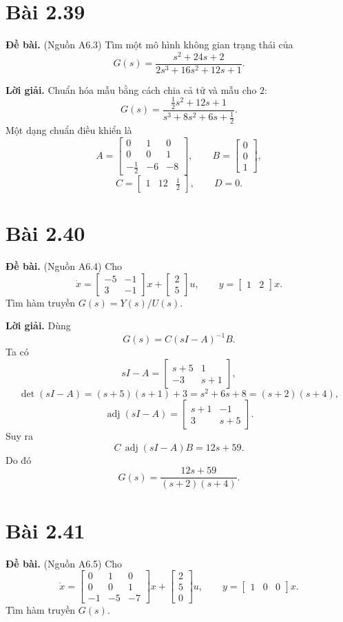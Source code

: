 \documentclass[11pt,a4paper]{article}
\newcommand{\baitap}[1]{%
  \Needspace{4\baselineskip}%
  \section*{Bài #1}%
}
\newcommand{\debai}{\par\noindent\textbf{Đề bài.}\enspace}
\newcommand{\loigiai}{\par\smallskip\noindent\textbf{Lời giải.}\enspace}
\begin{document}
\baitap{2.39}
\debai
(Nguồn A6.3) Tìm một mô hình không gian trạng thái của
\[
G(s)=
\frac{s^2+24s+2}
{2s^3+16s^2+12s+1}.
\]

\loigiai
Chuẩn hóa mẫu bằng cách chia cả tử và mẫu cho \(2\):
\[
G(s)
=
\frac{\frac12s^2+12s+1}
{s^3+8s^2+6s+\frac12}.
\]
Một dạng chuẩn điều khiển là
\[
\boxed{
A=
\begin{bmatrix}
0&1&0\\
0&0&1\\
-\frac12&-6&-8
\end{bmatrix},
\qquad
B=
\begin{bmatrix}
0\\0\\1
\end{bmatrix},
}
\]
\[
\boxed{
C=
\begin{bmatrix}
1&12&\frac12
\end{bmatrix},
\qquad D=0.
}
\]

\baitap{2.40}
\debai
(Nguồn A6.4) Cho
\[
\dot x=
\begin{bmatrix}
-5&-1\\
3&-1
\end{bmatrix}x
+
\begin{bmatrix}
2\\5
\end{bmatrix}u,
\qquad
y=
\begin{bmatrix}
1&2
\end{bmatrix}x.
\]
Tìm hàm truyền \(G(s)=Y(s)/U(s)\).

\loigiai
Dùng
\[
G(s)=C(sI-A)^{-1}B.
\]
Ta có
\[
sI-A=
\begin{bmatrix}
s+5&1\\
-3&s+1
\end{bmatrix},
\]
\[
\det(sI-A)
=
(s+5)(s+1)+3
=
s^2+6s+8
=
(s+2)(s+4),
\]
\[
\operatorname{adj}(sI-A)
=
\begin{bmatrix}
s+1&-1\\
3&s+5
\end{bmatrix}.
\]
Suy ra
\[
C\,\operatorname{adj}(sI-A)B
=
12s+59.
\]
Do đó
\[
\boxed{
G(s)=
\frac{12s+59}{(s+2)(s+4)}.
}
\]

\baitap{2.41}
\debai
(Nguồn A6.5) Cho
\[
\dot x=
\begin{bmatrix}
0&1&0\\
0&0&1\\
-1&-5&-7
\end{bmatrix}x
+
\begin{bmatrix}
2\\5\\0
\end{bmatrix}u,
\qquad
y=
\begin{bmatrix}
1&0&0
\end{bmatrix}x.
\]
Tìm hàm truyền \(G(s)\).
\end{document}
